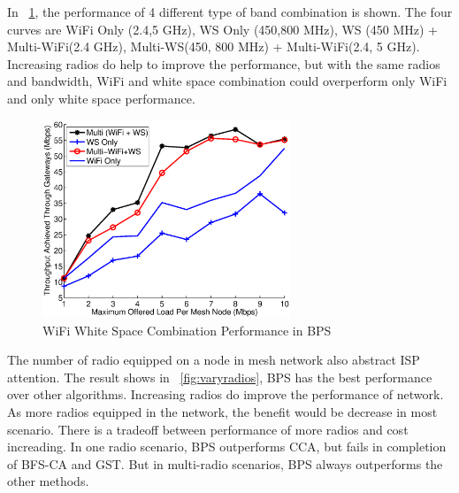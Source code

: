 
In ~\ref{fig:wifiws}, the performance of 4 different type of band combination is shown. 
The four curves are WiFi Only (2.4,5 GHz), WS Only (450,800 MHz), WS (450 MHz) + Multi-WiFi(2.4 GHz), Multi-WS(450, 800 MHz) + Multi-WiFi(2.4, 5 GHz). 
Increasing radios do help to improve the performance, but with the same radios and bandwidth, WiFi and white space combination could overperform only WiFi and only white space performance.

\begin{figure}
\centering
\includegraphics[width=74mm]{figures/wifiws}
\vspace{-0.1in}
\caption{WiFi White Space Combination Performance in BPS}                                                                               
\label{fig:wifiws}
\end{figure}

The number of radio equipped on a node in mesh network also abstract ISP attention. 
The result shows in ~\ref{fig:varyradios}, BPS has the best performance over other algorithms. 
Increasing radios do improve the performance of network. 
As more radios equipped in the network, the benefit would be decrease in most scenario. 
There is a tradeoff between performance of more radios and cost increading.
In one radio scenario, BPS outperforms CCA, but fails in completion of BFS-CA and GST.
But in multi-radio scenarios, BPS always outperforms the other methods.


